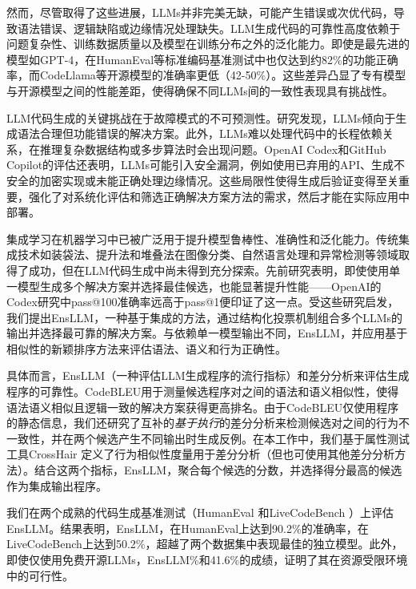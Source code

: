 \documentclass{article}
\newcommand{\tool}{EnsLLM}
\begin{document}
然而，尽管取得了这些进展，LLMs并非完美无缺，可能产生错误或次优代码，导致语法错误、逻辑缺陷或边缘情况处理缺失\cite{chen2021evaluating}。LLM生成代码的可靠性高度依赖于问题复杂性、训练数据质量以及模型在训练分布之外的泛化能力。即使是最先进的模型如GPT-4，在HumanEval等标准编码基准测试中也仅达到约82\%的功能正确率，而CodeLlama等开源模型的准确率更低（42-50\%）\cite{bubeck2023sparks, ziemniak2023codellama}。这些差异凸显了专有模型与开源模型之间的性能差距，使得确保不同LLMs间的一致性表现具有挑战性。

LLM代码生成的关键挑战在于故障模式的不可预测性。研究发现，LLMs倾向于生成语法合理但功能错误的解决方案\cite{li2022competition}。此外，LLMs难以处理代码中的长程依赖关系，在推理复杂数据结构或多步算法时会出现问题。OpenAI Codex和GitHub Copilot的评估还表明，LLMs可能引入安全漏洞，例如使用已弃用的API、生成不安全的加密实现或未能正确处理边缘情况\cite{pearce2022asleep}。这些局限性使得生成后验证变得至关重要，强化了对系统化评估和筛选正确解决方案方法的需求，然后才能在实际应用中部署。

集成学习在机器学习中已被广泛用于提升模型鲁棒性、准确性和泛化能力\cite{mienye2022survey}。传统集成技术如装袋法、提升法和堆叠法在图像分类、自然语言处理和异常检测等领域取得了成功，但在LLM代码生成中尚未得到充分探索。先前研究表明，即使使用单一模型生成多个解决方案并选择最佳候选，也能显著提升性能——OpenAI的Codex研究中pass@100准确率远高于pass@1便印证了这一点\cite{chen2021evaluating}。受这些研究启发，我们提出\tool，一种基于集成的方法，通过结构化投票机制组合多个LLMs的输出并选择最可靠的解决方案。与依赖单一模型输出不同，\tool{}，并应用基于相似性的新颖排序方法来评估语法、语义和行为正确性。

具体而言，\tool{} \cite{codebleu}（一种评估LLM生成程序的流行指标）和差分分析来评估生成程序的可靠性。CodeBLEU用于测量候选程序对之间的语法和语义相似性，使得语法语义相似且逻辑一致的解决方案获得更高排名。由于CodeBLEU仅使用程序的静态信息，我们还研究了互补的{\em 基于执行}的差分分析来检测候选对之间的行为不一致性，并在两个候选产生不同输出时生成反例。在本工作中，我们基于属性测试工具CrossHair \cite{crosshair}定义了行为相似性度量用于差分分析（但也可使用其他差分分析方法\cite{hydiff, lahiri2010differential}）。结合这两个指标，\tool{}，聚合每个候选的分数，并选择得分最高的候选作为集成输出程序。

我们在两个成熟的代码生成基准测试（HumanEval \cite{humaneval}和LiveCodeBench \cite{livecodebench}）上评估\tool。结果表明，\tool{}，在HumanEval上达到90.2\%的准确率，在LiveCodeBench上达到50.2\%，超越了两个数据集中表现最佳的独立模型。此外，即使仅使用免费开源LLMs，\tool{}\%和41.6\%的成绩，证明了其在资源受限环境中的可行性。
\end{document}
